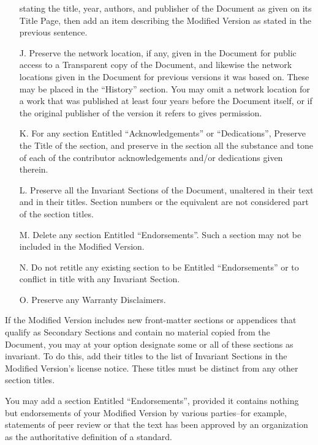 \begin{itemize}
        stating the title, year, authors, and publisher of the Document as
        given on its Title Page, then add an item describing the Modified
        Version as stated in the previous sentence.
    \item[J.] Preserve the network location, if any, given in the Document
        for public access to a Transparent copy of the Document, and likewise
        the network locations given in the Document for previous versions it
        was based on.  These may be placed in the ``History'' section. You
        may omit a network location for a work that was published at least
        four years before the Document itself, or if the original publisher
        of the version it refers to gives permission.
    \item[K.] For any section Entitled ``Acknowledgements'' or
        ``Dedications'', Preserve the Title of the section, and preserve in
        the section all the substance and tone of each of the contributor
        acknowledgements and/or dedications given therein.
    \item[L.] Preserve all the Invariant Sections of the Document, unaltered
        in their text and in their titles.  Section numbers or the equivalent
        are not considered part of the section titles.
    \item[M.] Delete any section Entitled ``Endorsements''.  Such a section
        may not be included in the Modified Version.
    \item[N.] Do not retitle any existing section to be Entitled
        ``Endorsements'' or to conflict in title with any Invariant Section.
    \item[O.] Preserve any Warranty Disclaimers.
\end{itemize}

If the Modified Version includes new front-matter sections or appendices that
qualify as Secondary Sections and contain no material copied from the Document,
you may at your option designate some or all of these sections as invariant.
To do this, add their titles to the list of Invariant Sections in the Modified
Version's license notice. These titles must be distinct from any other section
titles.

You may add a section Entitled ``Endorsements'', provided it contains nothing
but endorsements of your Modified Version by various parties--for example,
statements of peer review or that the text has been approved by an organization
as the authoritative definition of a standard.

